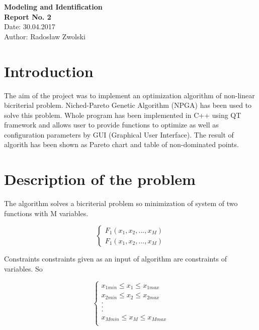 \documentclass[11pt]{article}
\begin{document}
	\begin{center}
		\huge{\textbf{Modeling and Identification}}\\
		\huge{\textbf{Report No. 2}}\\
		\Large{Date: 30.04.2017}\\
		\bigskip
		\Large{Author: Radosław Zwolski}
		
	\end{center}
	


	\section{Introduction}
	
	The aim of the project was to implement an optimization algorithm of non-linear
	bicriterial problem. Niched-Pareto Genetic Algorithm (NPGA) has been used to
	solve this problem. Whole program has been implemented in C++ using QT 	
	framework and allows user to provide functions to optimize as well 
	as configuration parameters by GUI (Graphical User Interface). The result of 
	algorith has been shown as Pareto chart and table of non-dominated points.
	
	\section{Description of the problem}
	
	The algorithm solves a bicriterial problem so minimization of system of two
	functions with M variables.
	
	$$\begin{cases}
		F_{1}(x_{1},x_{2},...,x_{M})\\
		F_{1}(x_{1},x_{2},...,x_{M})
	\end{cases}$$
	
	Constraints constraints given as an input of algorithm are constraints of
	variables. So
	
	$$\begin{cases}
		x_{1min} \leq x_{1} \leq x_{1max}\\
		x_{2min} \leq x_{2} \leq x_{2max}\\
		.\\
		.\\
		.\\
		x_{Mmin} \leq x_{M} \leq x_{Mmax}\\
	\end{cases}$$
	
\end{document}
